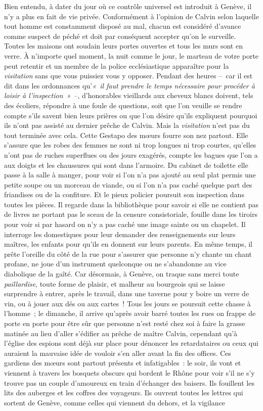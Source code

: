 \documentclass[french,twoside]{book} %
\begin{document}
Bien entendu, à dater du jour où ce contrôle universel est introduit à Genève, il n’y a plus en fait de vie privée. Conformément à l’opinion de Calvin selon laquelle tout homme est constamment disposé au mal, chacun est considéré d’avance comme suspect de péché et doit par conséquent accepter qu’on le surveille. Toutes les maisons ont soudain leurs portes ouvertes et tous les murs sont en verre. À n’importe quel moment, la nuit comme le jour, le marteau de votre porte peut retentir et un membre de la police ecclésiastique apparaître pour la \emph{visitation} sans que vous puissiez vous y opposer. Pendant des heures – car il est dit dans les ordonnances qu’\emph{« il faut prendre le temps nécessaire pour procéder à loisir à l’inspection »} –, d’honorables vieillards aux cheveux blancs doivent, tels des écoliers, répondre à une foule de questions, soit que l’on veuille se rendre compte s’ils savent bien leurs prières ou que l’on désire qu’ils expliquent pourquoi ils n’ont pas assisté au dernier prêche de Calvin. Mais la \emph{visitation} n’est pas du tout terminée avec cela. Cette Gestapo des mœurs fourre son nez partout. Elle s’assure que les robes des femmes ne sont ni trop longues ni trop courtes, qu’elles n’ont pas de ruches superflues ou des jours exagérés, compte les bagues que l’on a aux doigts et les chaussures qui sont dans l’armoire. Du cabinet de toilette elle passe à la salle à manger, pour voir si l’on n’a pas ajouté au seul plat permis une petite soupe ou un morceau de viande, ou si l’on n’a pas caché quelque part des friandises ou de la confiture. Et le pieux policier poursuit son inspection dans toutes les pièces. Il regarde dans la bibliothèque pour savoir si elle ne contient pas de livres ne portant pas le sceau de la censure consistoriale, fouille dans les tiroirs pour voir si par hasard on n’y a pas caché une image sainte ou un chapelet. Il interroge les domestiques pour leur demander des renseignements sur leurs maîtres, les enfants pour qu’ils en donnent sur leurs parents. En même temps, il prête l’oreille du côté de la rue pour s’assurer que personne n’y chante un chant profane, ne joue d’un instrument quelconque ou ne s’abandonne au vice diabolique de la gaîté. Car désormais, à Genève, on traque sans merci toute \emph{paillardise}, toute forme de plaisir, et malheur au bourgeois qui se laisse surprendre à entrer, après le travail, dans une taverne pour y boire un verre de vin, ou à jouer aux dés ou aux cartes ! Tous les jours se poursuit cette chasse à l’homme ; le dimanche, il arrive qu’après avoir barré toutes les rues on frappe de porte en porte pour être sûr que personne n’est resté chez soi à faire la grasse matinée au lieu d’aller s’édifier au prêche de maître Calvin, cependant qu’à l’église des espions sont déjà sur place pour dénoncer les retardataires ou ceux qui auraient la mauvaise idée de vouloir s’en aller avant la fin des offices. Ces gardiens des mœurs sont partout présents et infatigables : le soir, ils vont et viennent à travers les bosquets obscurs qui bordent le Rhône pour voir s’il ne s’y trouve pas un couple d’amoureux en train d’échanger des baisers. Ils fouillent les lits des auberges et les coffres des voyageurs. Ils ouvrent toutes les lettres qui sortent de Genève, comme celles qui viennent du dehors, et la vigilance 
\end{document}
